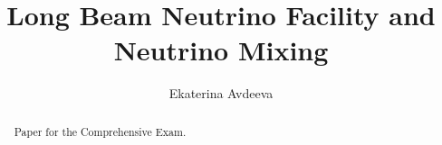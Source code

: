 \documentclass{article}
\begin{document}
 
\pagenumbering{}
\title{\textbf{Long Beam Neutrino Facility and Neutrino Mixing}}

\author{Ekaterina Avdeeva}

\maketitle

\begin{abstract}
Paper for the Comprehensive Exam.
\end{abstract}




\pagestyle{fancy}
\fancyhf{}
\lhead[]{\thepage}
\rhead[\thepage]{}

\tableofcontents

%
\clearpage

\clearpage

\clearpage

\clearpage

\clearpage

\clearpage
\end{document}
